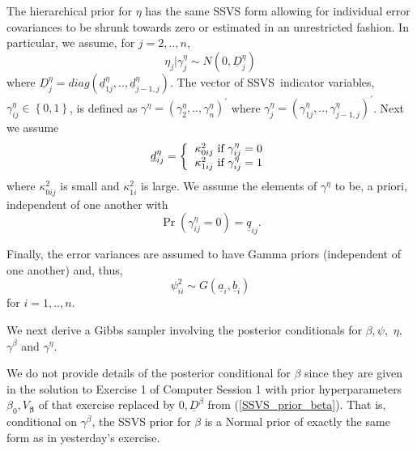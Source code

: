 \documentclass{article}
\begin{document}
The hierarchical prior for $\eta $ has the same SSVS form allowing for
individual error covariances to be shrunk towards zero or estimated in an
unrestricted fashion. In particular, we assume, for $j=2,..,n$,%
\begin{equation}
\eta _{j}|\gamma _{j}^{\eta }\sim N\left( 0,\underline{D}_{j}^{\eta }\right)
\label{SSVS_prior_eta}
\end{equation}%
where $\underline{D}_{j}^{\eta }=diag\left( \underline{d}_{1j}^{\eta },..,%
\underline{d}_{j-1,j}^{\eta }\right) $. The vector of SSVS\ indicator
variables, $\gamma _{ij}^{\eta }\in \left\{ 0,1\right\} $, is defined as $%
\gamma ^{\eta }=\left( \gamma _{2}^{\eta },..,\gamma _{n}^{\eta }\right)
^{\prime }$ where $\gamma _{j}^{\eta }=\left( \gamma _{1j}^{\eta },..,\gamma
_{j-1,j}^{\eta }\right) ^{\prime }$. Next we assume%
\begin{equation*}
\underline{d}_{ij}^{\eta }=\left\{ 
\begin{tabular}{l}
$\kappa _{0ij}^{2}$ if $\gamma _{ij}^{\eta }=0$ \\ 
$\kappa _{1ij}^{2}$ if $\gamma _{ij}^{\eta }=1$%
\end{tabular}%
\right.
\end{equation*}%
where $\kappa _{0ij}^{2}$ is small and $\kappa _{1i}^{2}$ is large. We
assume the elements of $\gamma ^{\eta }$ to be, a priori, independent of one
another with%
\begin{equation}
\Pr \left( \gamma _{ij}^{\eta }=0\right) =\underline{q}_{ij}.
\label{SSVS_prior_gammaa}
\end{equation}

Finally, the error variances are assumed to have Gamma priors (independent
of one another) and, thus,%
\begin{equation}
\psi _{ii}^{2}\sim G\left( \underline{a}_{i},\underline{b}_{i}\right)
\label{SSVS_prior_psi}
\end{equation}%
for $i=1,..,n$.

We next derive a Gibbs sampler involving the posterior conditionals for $%
\beta ,\psi ,$ $\eta ,$ $\gamma ^{\beta }$ and $\gamma ^{\eta }$.

We do not provide details of the posterior conditional for $\beta $ since
they are given in the solution to Exercise 1 of Computer Session 1 with
prior hyperparameters $\beta _{0},V_{\boldsymbol{\beta }}$ of that exercise
replaced by $0,\underline{D}^{\beta }$ from (\ref{SSVS_prior_beta}). That
is, conditional on $\gamma ^{\beta }$, the SSVS prior for $\beta $ is a
Normal prior of exactly the same form as in yesterday's exercise.
\end{document}

